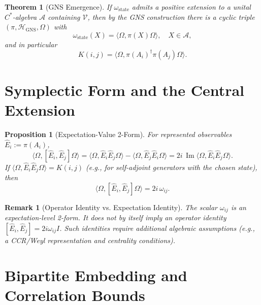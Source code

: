 \documentclass[11pt, a4paper]{article}
\newtheorem{theorem}{Theorem}
\newtheorem{proposition}{Proposition}
\newtheorem{remark}{Remark}
\begin{document}
\begin{theorem}[GNS Emergence]
If $\omega_{\mathrm{state}}$ admits a positive extension to a unital $C^*$-algebra $\mathcal{A}$ containing $\mathcal{V}$, then by the GNS construction there is a cyclic triple $(\pi,\mathcal{H}_{\mathrm{GNS}},\Omega)$ with
\begin{equation}
    \omega_{\mathrm{state}}(X)=\langle \Omega,\pi(X)\Omega\rangle, \quad X\in\mathcal{A},
\end{equation}
and in particular
\begin{equation}
    K(i,j)=\langle \Omega,\pi(A_i)^\dagger\pi(A_j)\Omega\rangle.
\end{equation}
\end{theorem}

\section{Symplectic Form and the Central Extension}

\begin{proposition}[Expectation-Value 2-Form]
For represented observables $\hat E_i:=\pi(A_i)$,
\begin{equation}
    \langle\Omega,[\hat E_i,\hat E_j]\Omega\rangle
    =\langle\Omega,\hat E_i\hat E_j\Omega\rangle-\langle\Omega,\hat E_j\hat E_i\Omega\rangle
    =2i\,\operatorname{Im}\langle\Omega,\hat E_i\hat E_j\Omega\rangle.
\end{equation}
If $\langle\Omega,\hat E_i\hat E_j\Omega\rangle=K(i,j)$ (e.g., for self-adjoint generators with the chosen state), then
\begin{equation}
\langle\Omega,[\hat E_i,\hat E_j]\Omega\rangle=2i\,\omega_{ij}.
\end{equation}
\end{proposition}

\begin{remark}[Operator Identity vs. Expectation Identity]
The scalar $\omega_{ij}$ is an expectation-level 2-form. It does not by itself imply an operator identity $[\hat E_i,\hat E_j]=2i\omega_{ij}I$. Such identities require additional algebraic assumptions (e.g., a CCR/Weyl representation and centrality conditions).
\end{remark}

\section{Bipartite Embedding and Correlation Bounds}
\end{document}
